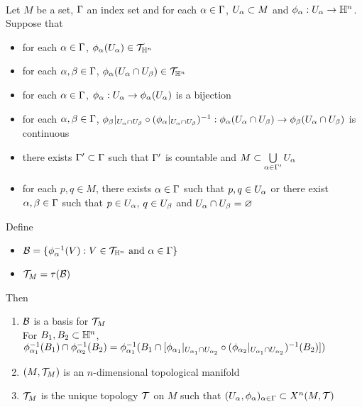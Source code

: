 \documentclass{book}
\begin{document}
	\begin{ex}   \\
		Let $M$ be a set, $\Gamma$ an index set and for each $\alpha \in \Gamma$, $U_{\alpha} \subset M$ and $\phi_{\alpha}: U_{\alpha} \rightarrow \mathbb{H}^n$. Suppose that 
		\begin{itemize}
			\item for each $\alpha \in \Gamma$, $\phi_{\alpha}(U_{\alpha}) \in \mathcal{T}_{\mathbb{H}^n}$ 
			\item for each $\alpha, \beta \in \Gamma$, $\phi_{\alpha}(U_{\alpha} \cap U_{\beta}) \in \mathcal{T}_{\mathbb{H}^n}$
			\item for each $\alpha \in \Gamma$, $\phi_{\alpha}: U_{\alpha} \rightarrow \phi_{\alpha}(U_{\alpha})$ is a bijection
			\item for each $\alpha, \beta \in \Gamma$, $\phi_{\beta}|_{U_{\alpha} \cap U_{\beta}} \circ (\phi_{\alpha}|_{U_{\alpha} \cap U_{\beta}})^{-1}: \phi_{\alpha}(U_{\alpha} \cap U_{\beta}) \rightarrow \phi_{\beta}(U_{\alpha} \cap U_{\beta})$ is continuous
			\item there exists $\Gamma' \subset \Gamma$ such that $\Gamma'$ is countable and $M \subset \bigcup\limits_{\alpha \in \Gamma'} U_{\alpha}$
			\item for each $p,q \in M$, there exists $\alpha \in \Gamma$ such that $p,q \in U_{\alpha}$ or there exist $\alpha,\beta \in \Gamma$ such that $p \in U_{\alpha}$, $q \in U_{\beta}$ and $U_{\alpha} \cap U_{\beta} = \varnothing$
		\end{itemize}
		Define 
		\begin{itemize}
			\item $\mathcal{B} = \{\phi_{\alpha}^{-1}(V): V \in \mathcal{T}_{\mathbb{H}^n} \text{ and $\alpha \in \Gamma$} \}$
			\item $\mathcal{T}_M = \tau(\mathcal{B})$
		\end{itemize}
		Then  
		\begin{enumerate}
			\item $\mathcal{B}$ is a basis for $\mathcal{T}_M$ \\
			 For $B_1, B_2 \subset \mathbb{H}^n$, $\phi_{\alpha_1}^{-1}(B_1) \cap \phi_{\alpha_2}^{-1}(B_2) = \phi_{\alpha_1}^{-1}( B_1 \cap [\phi_{\alpha_1}|_{U_{\alpha_1} \cap U_{\alpha_2}} \circ (\phi_{\alpha_2}|_{U_{\alpha_1} \cap U_{\alpha_2}})^{-1}(B_2)])$
			\item $(M, \mathcal{T}_M)$ is an $n$-dimensional topological manifold
			\item $\mathcal{T}_M$ is the unique topology $\mathcal{T}$ on $M$ such that $(U_{\alpha}, \phi_{\alpha})_{\alpha \in \Gamma} \subset X^n(M, \mathcal{T})$
		\end{enumerate}
	\end{ex}
	
\end{document}
